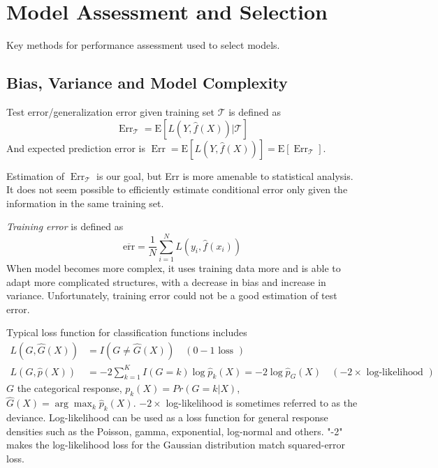 \chapter{Model Assessment and Selection}
Key methods for performance assessment used to select models. 

\section{Bias, Variance and Model Complexity}
Test error/generalization error given training set $\mathcal{T}$ is defined as 
\begin{equation*}
    \operatorname{Err}_{\mathcal{T}}=\mathrm{E}[L(Y, \hat{f}(X)) | \mathcal{T}]
\end{equation*}
And expected prediction error is $\operatorname{Err}
=\mathrm{E}[L(Y, \hat{f}(X))]=\mathrm{E}\left[\operatorname{Err}_{\mathcal{T}}\right]$. 

Estimation of $\operatorname{Err}_{\mathcal{T}}$ is our goal, but Err is more amenable to statistical analysis. It does not seem possible to efficiently estimate conditional error only given the information in the same training set. 

\textit{Training error} is defined as
\begin{equation*}
    \overline{\mathrm{err}}=\frac{1}{N} \sum_{i=1}^{N} L\left(y_{i}, \hat{f}\left(x_{i}\right)\right)
\end{equation*}
When model becomes more complex, it uses training data more and is able to adapt more complicated structures, with a decrease in bias and increase in variance. Unfortunately, training error could not be a good estimation of test error. 

Typical loss function for classification functions includes
\begin{align*}
L(G, \hat{G}(X)) &=I(G \neq \hat{G}(X)) \quad(0-1 \text { loss }) \\ 
L(G, \hat{p}(X)) &=-2 \sum_{k=1}^{K} I(G=k) \log \hat{p}_{k}(X)=-2 \log \hat{p}_{G}(X) \quad(-2 \times \text { log-likelihood })
\end{align*}
$G$ the categorical response, $p_k(X)=Pr(G=k|X)$, $\hat{G}(X)=\arg\max_k\hat{p}_k(X)$. 
$-2 \times$ log-likelihood is sometimes referred to as the deviance. Log-likelihood can be used as a loss function for general response densities such as the Poisson, gamma, exponential, log-normal and others. "-2" makes the log-likelihood loss for the Gaussian distribution match squared-error loss. 

